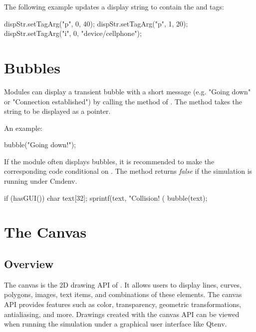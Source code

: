 The following example updates a display string to contain the  and
 tags:

\begin{cpp}
dispStr.setTagArg("p", 0, 40);
dispStr.setTagArg("p", 1, 20);
dispStr.setTagArg("i", 0, "device/cellphone");
\end{cpp}

\section{Bubbles}
\label{sec:graphics:bubbles}

Modules can display a transient bubble with a short message (e.g. "Going
down" or "Connection established") by calling the  method of
. The method takes the string to be displayed as a
 pointer.

An example:
\begin{cpp}
bubble("Going down!");
\end{cpp}

\begin{center}
\end{center}

If the module often displays bubbles, it is recommended to make the
corresponding code conditional on . The 
method returns \textit{false} if the simulation is running under Cmdenv.

\begin{cpp}
if (hasGUI()) {
    char text[32];
    sprintf(text, "Collision! (%
    bubble(text);
}
\end{cpp}



\section{The Canvas}
\label{sec:graphics:canvas}

\subsection{Overview}
\label{sec:graphics:canvas-overview}

The canvas is the 2D drawing API of {\opp}. It allows users to display lines,
curves, polygons, images, text items, and combinations of these elements. The
canvas API provides features such as color, transparency, geometric
transformations, antialiasing, and more. Drawings created with the canvas API
can be viewed when running the simulation under a graphical user interface like
Qtenv.


